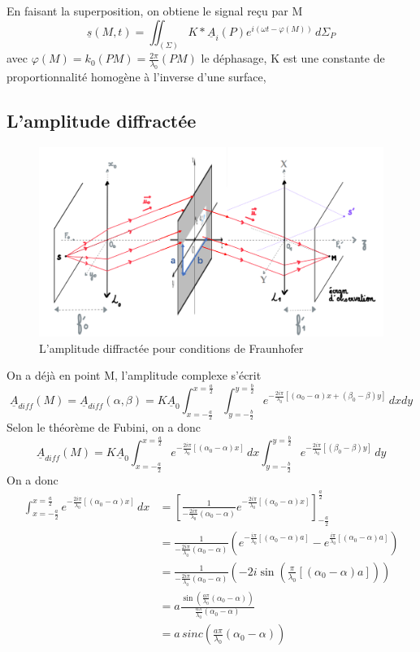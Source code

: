 \documentclass[a4paper,12pt]{book}
\begin{document}
En faisant la superposition, on obtiene le signal reçu par M
$$
\boxed{\underline{s}(M,t)=\iint_{(\Sigma)}K*\underline{A}_i(P)e^{i(\omega t-\varphi(M))}\,d\Sigma_P}
$$
avec $\varphi(M)=k_0(PM)=\frac{2\pi}{\lambda_0}(PM)$ le déphasage, K est une constante de proportionnalité homogène à l'inverse d'une surface, 
\subsection{L’amplitude diffractée}
\begin{figure}[h]
    \begin{center}
    \includegraphics[scale=0.6]{tr152.png}
    \end{center}
    \caption{L’amplitude diffractée pour conditions de Fraunhofer}
\end{figure}
On a déjà en point M, l'amplitude complexe s'écrit
$$
\underline{A}_{diff}(M)=\underline{A}_{diff}(\alpha,\beta)=K\underline{A}_0\int^{x=\frac{a}{2}}_{x=-\frac{a}{2}}\int^{y=\frac{b}{2}}_{y=-\frac{b}{2}}e^{-\frac{2i\pi}{\lambda_0}[(\alpha_0-\alpha)x+(\beta_0-\beta)y]}\,dxdy
$$
Selon le théorème de Fubini, on a donc 
$$
\underline{A}_{diff}(M)=K\underline{A}_0\int^{x=\frac{a}{2}}_{x=-\frac{a}{2}}e^{-\frac{2i\pi}{\lambda_0}[(\alpha_0-\alpha)x]}\,dx\int^{y=\frac{b}{2}}_{y=-\frac{b}{2}}e^{-\frac{2i\pi}{\lambda_0}[(\beta_0-\beta)y]}\,dy
$$
On a donc 
\begin{align*}
\int^{x=\frac{a}{2}}_{x=-\frac{a}{2}}e^{-\frac{2i\pi}{\lambda_0}[(\alpha_0-\alpha)x]}\,dx&=\left[\frac{1}{-\frac{2i\pi}{\lambda_0}(\alpha_0-\alpha)}e^{-\frac{2i\pi}{\lambda_0}[(\alpha_0-\alpha)x]}\right]^{\frac{a}{2}}_{-\frac{a}{2}}\\
&=\frac{1}{-\frac{2i\pi}{\lambda_0}(\alpha_0-\alpha)}\left(e^{-\frac{i\pi}{\lambda_0}[(\alpha_0-\alpha)a]}-e^{\frac{i\pi}{\lambda_0}[(\alpha_0-\alpha)a]}\right)\\
&=\frac{1}{-\frac{2i\pi}{\lambda_0}(\alpha_0-\alpha)}\left(-2i\sin(\frac{\pi}{\lambda_0}[(\alpha_0-\alpha)a])\right)\\
&=a\frac{\sin(\frac{a\pi}{\lambda_0}(\alpha_0-\alpha))}{\frac{a\pi}{\lambda_0}(\alpha_0-\alpha)}\\
&=a\,sinc(\frac{a\pi}{\lambda_0}(\alpha_0-\alpha))
\end{align*}
\end{document}
